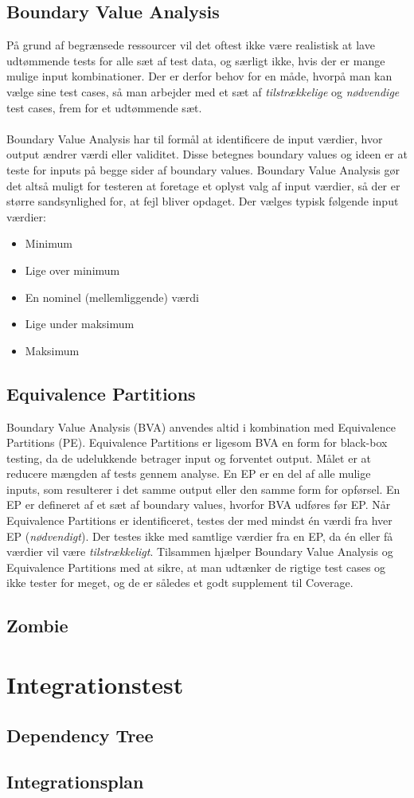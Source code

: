 \documentclass[a4paper,12pt,fleqn,oneside]{article}
\begin{document}
\subsection{Boundary Value Analysis}
På grund af begrænsede ressourcer vil det oftest ikke være realistisk at lave udtømmende tests for alle sæt af test data, og særligt ikke, hvis der er mange mulige input kombinationer. Der er derfor behov for en måde, hvorpå man kan vælge sine test cases, så man arbejder med et sæt af \textit{tilstrækkelige} og \textit{nødvendige} test cases, frem for et udtømmende sæt. \\\\Boundary Value Analysis har til formål at identificere de input værdier, hvor output ændrer værdi eller validitet. Disse betegnes boundary values og ideen er at teste for inputs på begge sider af boundary values. Boundary Value Analysis gør det altså muligt for testeren at foretage et oplyst valg af input værdier, så der er større sandsynlighed for, at fejl bliver opdaget. Der vælges typisk følgende input værdier:

\begin{itemize}
    \item Minimum
    \item Lige over minimum
    \item En nominel (mellemliggende) værdi
    \item Lige under maksimum
    \item Maksimum
\end{itemize}

\subsection{Equivalence Partitions}
Boundary Value Analysis (BVA) anvendes altid i kombination med Equivalence Partitions (PE). Equivalence Partitions er ligesom BVA en form for black-box testing, da de udelukkende betrager input og forventet output. Målet er at reducere mængden af tests gennem analyse. En EP er en del af alle mulige inputs, som resulterer i det samme output eller den samme form for opførsel. En EP er defineret af et sæt af boundary values, hvorfor BVA udføres før EP. Når Equivalence Partitions er identificeret, testes der med mindst én værdi fra hver EP (\textit{nødvendigt}). Der testes ikke med samtlige værdier fra en EP, da én eller få værdier vil være \textit{tilstrækkeligt}. Tilsammen hjælper Boundary Value Analysis og Equivalence Partitions med at sikre, at man udtænker de rigtige test cases og ikke tester for meget, og de er således et godt supplement til Coverage.

\subsection{Zombie}




\section{Integrationstest}

\subsection{Dependency Tree}

\subsection{Integrationsplan}

\printbibliography
\end{document}
